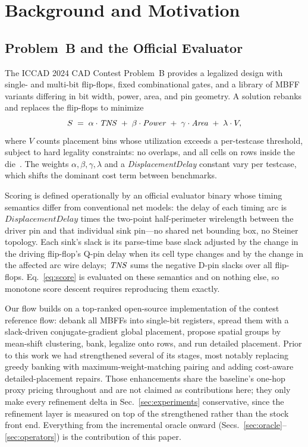 \section{Background and Motivation}
\label{sec:background}

\subsection{Problem~B and the Official Evaluator}
\label{sec:problemb}

The ICCAD 2024 CAD Contest Problem~B provides a legalized design with single- and multi-bit flip-flops, fixed combinational gates, and a library of MBFF variants differing in bit width, power, area, and pin geometry. A solution rebanks and replaces the flip-flops to minimize
\begin{equation}
S \;=\; \alpha \cdot \mathit{TNS} \;+\; \beta \cdot \mathit{Power} \;+\; \gamma \cdot \mathit{Area} \;+\; \lambda \cdot V,
\label{eq:score}
\end{equation}
where $V$ counts placement bins whose utilization exceeds a per-testcase threshold, subject to hard legality constraints: no overlaps, and all cells on rows inside the die~\cite{yang2024contest,fang2024overview}. The weights $\alpha,\beta,\gamma,\lambda$ and a \emph{DisplacementDelay} constant vary per testcase, which shifts the dominant cost term between benchmarks.

Scoring is defined operationally by an official evaluator binary whose timing semantics differ from conventional net models: the delay of each timing arc is $\mathit{DisplacementDelay}$ times the two-point half-perimeter wirelength between the driver pin and that individual sink pin---no shared net bounding box, no Steiner topology. Each sink's slack is its parse-time base slack adjusted by the change in the driving flip-flop's Q-pin delay when its cell type changes and by the change in the affected arc wire delays; $\mathit{TNS}$ sums the negative D-pin slacks over all flip-flops. Eq.~\eqref{eq:score} is evaluated on these semantics and on nothing else, so monotone score descent requires reproducing them exactly.

Our flow builds on a top-ranked open-source implementation of the contest reference flow: debank all MBFFs into single-bit registers, spread them with a slack-driven conjugate-gradient global placement, propose spatial groups by mean-shift clustering, bank, legalize onto rows, and run detailed placement. Prior to this work we had strengthened several of its stages, most notably replacing greedy banking with maximum-weight-matching pairing and adding cost-aware detailed-placement repairs. Those enhancements share the baseline's one-hop proxy pricing throughout and are not claimed as contributions here; they only make every refinement delta in Sec.~\ref{sec:experiments} conservative, since the refinement layer is measured on top of the strengthened rather than the stock front end. Everything from the incremental oracle onward (Secs.~\ref{sec:oracle}--\ref{sec:operators}) is the contribution of this paper.

